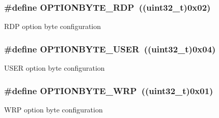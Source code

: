 \subsubsection[{\texorpdfstring{O\+P\+T\+I\+O\+N\+B\+Y\+T\+E\+\_\+\+R\+DP}{OPTIONBYTE_RDP}}]{\setlength{\rightskip}{0pt plus 5cm}\#define O\+P\+T\+I\+O\+N\+B\+Y\+T\+E\+\_\+\+R\+DP~((uint32\+\_\+t)0x02)}\hypertarget{group___f_l_a_s_h_ex___option___type_ga8f0bdb21ef13bae39d5d8b6619e2df06}{}\label{group___f_l_a_s_h_ex___option___type_ga8f0bdb21ef13bae39d5d8b6619e2df06}
R\+DP option byte configuration 
\subsubsection[{\texorpdfstring{O\+P\+T\+I\+O\+N\+B\+Y\+T\+E\+\_\+\+U\+S\+ER}{OPTIONBYTE_USER}}]{\setlength{\rightskip}{0pt plus 5cm}\#define O\+P\+T\+I\+O\+N\+B\+Y\+T\+E\+\_\+\+U\+S\+ER~((uint32\+\_\+t)0x04)}\hypertarget{group___f_l_a_s_h_ex___option___type_gac7d843e666e15c79688a1914e8ffe7a5}{}\label{group___f_l_a_s_h_ex___option___type_gac7d843e666e15c79688a1914e8ffe7a5}
U\+S\+ER option byte configuration 
\subsubsection[{\texorpdfstring{O\+P\+T\+I\+O\+N\+B\+Y\+T\+E\+\_\+\+W\+RP}{OPTIONBYTE_WRP}}]{\setlength{\rightskip}{0pt plus 5cm}\#define O\+P\+T\+I\+O\+N\+B\+Y\+T\+E\+\_\+\+W\+RP~((uint32\+\_\+t)0x01)}\hypertarget{group___f_l_a_s_h_ex___option___type_ga48712a166ea192ddcda0f2653679f9ec}{}\label{group___f_l_a_s_h_ex___option___type_ga48712a166ea192ddcda0f2653679f9ec}
W\+RP option byte configuration 